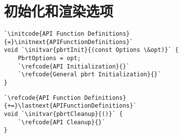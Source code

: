 \section{初始化和渲染选项}\label{sec:初始化和渲染选项}

\begin{lstlisting}
`\initcode{API Function Definitions}{=}\initnext{APIFunctionDefinitions}`
void `\initvar{pbrtInit}{(const Options \&opt)}` {
    PbrtOptions = opt;
    `\refcode{API Initialization}{}`
    `\refcode{General pbrt Initialization}{}`
}
\end{lstlisting}

\begin{lstlisting}
`\refcode{API Function Definitions}{+=}\lastnext{APIFunctionDefinitions}` 
void `\initvar{pbrtCleanup}{()}` {
    `\refcode{API Cleanup}{}`
}
\end{lstlisting}